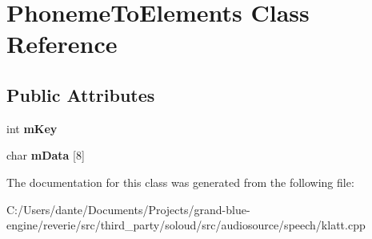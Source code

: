 \hypertarget{class_phoneme_to_elements}{}\section{Phoneme\+To\+Elements Class Reference}
\label{class_phoneme_to_elements}
\subsection*{Public Attributes}
\begin{DoxyCompactItemize}
\item 
\mbox{\label{class_phoneme_to_elements_a107cec11d2c992126be791bcf7fc0f29}} 
int {\bfseries m\+Key}
\item 
\mbox{\label{class_phoneme_to_elements_a01d730e194e009adbd9b99c3a0379848}} 
char {\bfseries m\+Data} \mbox{[}8\mbox{]}
\end{DoxyCompactItemize}


The documentation for this class was generated from the following file\+:\begin{DoxyCompactItemize}
\item 
C\+:/\+Users/dante/\+Documents/\+Projects/grand-\/blue-\/engine/reverie/src/third\+\_\+party/soloud/src/audiosource/speech/klatt.\+cpp\end{DoxyCompactItemize}
